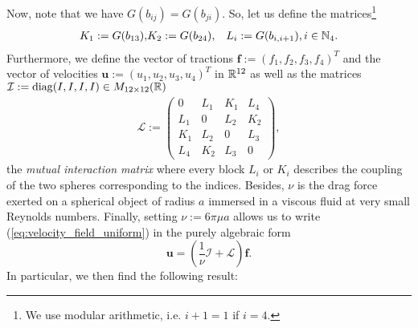 Now, note that we have $G(b_{ij}) = G(b_{ji})$. So, let us define the matrices\footnote{We use modular arithmetic, i.e. $i + 1 = 1$ if $i = 4$.}
\begin{eqnarray}
 K_1 := G(b_{13}), &  K_2 := G(b_{24}), &  L_i := G(b_{i, i + 1}), i \in \mathbb{N}_4.
\end{eqnarray}
Furthermore, we define the vector of tractions $\boldsymbol f := (f_1, f_2, f_3, f_4)^T$ and the vector of velocities $\mathbf{u} := (u_1, u_2, u_3, u_4)^T$ in $\mathbb{R}^{12}$ as well as the matrices $\mathcal{I} := \operatorname{diag}(I, I, I, I) \in M_{12 \times 12}(\mathbb{R})$
\begin{align}
\mathcal{L} := \left (\begin{array}{cccc}
0 & L_1 & K_1 & L_4 \\ 
L_1 & 0 & L_2 & K_2 \\ 
K_1 & L_2 & 0 & L_3 \\ 
L_4 & K_2 & L_3 & 0
\end{array}  \right ),
\end{align}
the \emph{mutual interaction matrix} where every block $L_i$ or $K_i$ describes the coupling of the two spheres corresponding to the indices. Besides, $\nu$ is the drag force exerted on a spherical object of radius $a$ immersed in a viscous fluid at very small Reynolds numbers. Finally, setting $\nu := 6 \pi \mu a$ allows us to write (\ref{eq:velocity_field_uniform}) in the purely algebraic form
\begin{equation}
	\mathbf{u} = (\frac{1}{\nu} \mathcal{I} + \mathcal{L}) \boldsymbol f.
\end{equation}
In particular, we then find the following result:

